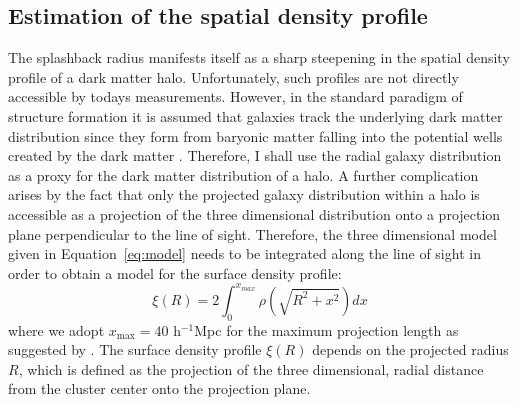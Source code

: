 \documentclass[a4paper,fleqn,usenatbib]{mnras}
\begin{document}
\subsection{Estimation of the spatial density profile}
\label{sec:estimators}
The splashback radius manifests itself as a sharp steepening in the spatial density profile of a dark matter halo. Unfortunately, such profiles are not directly accessible by todays measurements. However, in the standard paradigm of structure formation it is assumed that galaxies track the underlying dark matter distribution since they form from baryonic matter falling into the potential wells created by the dark matter \citep{rees1977cooling,white1978core,fall1980formation,blumenthal1984formation}. Therefore, I shall use the radial galaxy distribution as a proxy for the dark matter distribution of a halo. A further complication arises by the fact that only the projected galaxy distribution within a halo is accessible as a projection of the three dimensional distribution onto a projection plane perpendicular to the line of sight. Therefore, the three dimensional model given in Equation~\ref{eq:model} needs to be integrated along the line of sight in order to obtain a model for the surface density profile:
\begin{equation}
\xi(R)=2\int^{x_{max}}_0 \rho(\sqrt{R^2+x^2}) dx 
\label{eq:surface}
\end{equation}
where we adopt $x_{\mathrm{max}}=40 $ h$^{-1}$Mpc for the maximum projection length as suggested by \citet{more2016detection}. The surface density profile $\xi(R)$ depends on the projected radius $R$, which is defined as the projection of the three dimensional, radial distance from the cluster center onto the projection plane.
\end{document}
